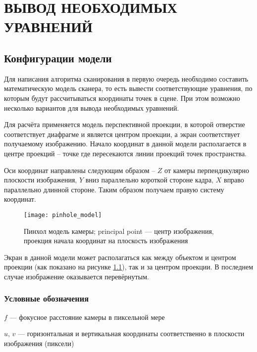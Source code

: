 \chapter{ВЫВОД НЕОБХОДИМЫХ УРАВНЕНИЙ}\label{chap:math}
    \section{Конфигурации модели}
        Для написания алгоритма сканирования в первую очередь необходимо составить математическую модель сканера, то есть вывести соответствующие уравнения, по которым будут рассчитываться координаты точек в сцене. При этом возможно несколько вариантов для вывода необходимых уравнений.
        
        Для расчёта применяется модель перспективной проекции, в которой отверстие соответствует диафрагме и является центром проекции, а экран соответствует получаемому изображению. Начало координат в данной модели располагается в центре проекций -- точке где пересекаются линии проекций точек пространства.
        
        Оси координат направлены следующим образом -- $ Z $ от камеры перпендикулярно плоскости изображения, $ Y $ вниз параллельно короткой стороне кадра, $ X $ вправо параллельно длинной стороне. Таким образом получаем правую систему координат.
        
        \begin{figure}[H]
            \centering
            \texttt{[image: pinhole\_model]}
            \caption{Пинхол модель камеры; principal point --- центр изображения, проекция начала координат на плоскость изображения}\label{pic:pinhole_model}
        \end{figure}

        Экран в данной модели может располагаться как между объектом и центром проекции (как показано на рисунке \ref{pic:pinhole_model}), так и за центром проекции. В последнем случае изображение оказывается перевёрнутым.

        \subsection{Условные обозначения}
            \noindent $ f $ --- фокусное расстояние камеры в пиксельной мере
            
            $ u,\,v $ --- горизонтальная и вертикальная координаты соответственно в плоскости изображения (пиксели) 
            
